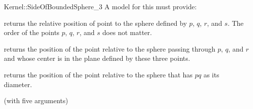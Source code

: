 \begin{ccRefFunctionObjectConcept}{Kernel::SideOfBoundedSphere_3}
A model for this must provide:


         {returns the relative position of point 
          to the sphere defined by $p$, $q$, $r$, and $s$. The order
          of the points $p$, $q$, $r$, and $s$ does not matter.
          }

   {returns the position of the point  relative to the sphere
    passing through $p$, $q$, and $r$ and whose center is in the plane defined
    by these three points.}

         {returns the position of the point  relative to the sphere
          that has $pq$ as its diameter.}

\ccRefines
{} (with five arguments)

\ccSeeAlso
{} \\


\end{ccRefFunctionObjectConcept}
